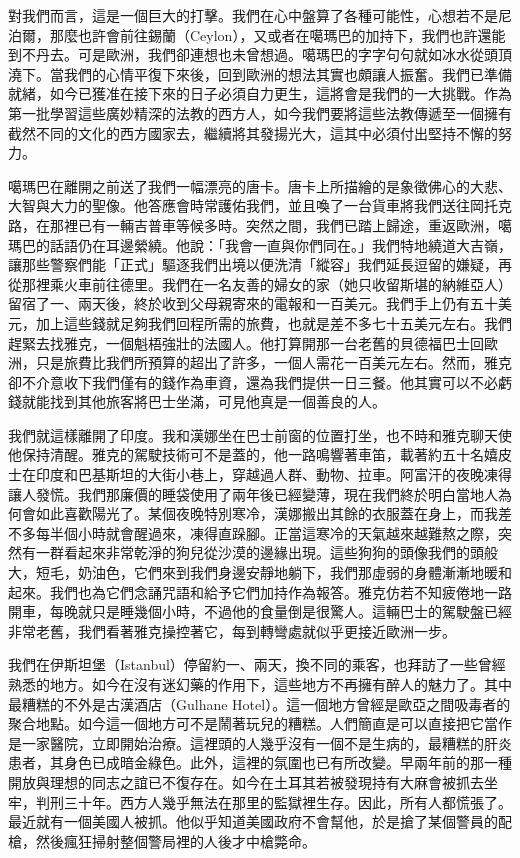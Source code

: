 對我們而言，這是一個巨大的打擊。我們在心中盤算了各種可能性，心想若不是尼泊爾，那麼也許會前往錫蘭（Ceylon），又或者在噶瑪巴的加持下，我們也許還能到不丹去。可是歐洲，我們卻連想也未曾想過。噶瑪巴的字字句句就如冰水從頭頂澆下。當我們的心情平復下來後，回到歐洲的想法其實也頗讓人振奮。我們已準備就緒，如今已獲准在接下來的日子必須自力更生，這將會是我們的一大挑戰。作為第一批學習這些廣妙精深的法教的西方人，如今我們要將這些法教傳遞至一個擁有截然不同的文化的西方國家去，繼續將其發揚光大，這其中必須付出堅持不懈的努力。

噶瑪巴在離開之前送了我們一幅漂亮的唐卡。唐卡上所描繪的是象徵佛心的大悲、大智與大力的聖像。他答應會時常護佑我們，並且喚了一台貨車將我們送往岡托克路，在那裡已有一輛吉普車等候多時。突然之間，我們已踏上歸途，重返歐洲，噶瑪巴的話語仍在耳邊縈繞。他說：「我會一直與你們同在。」我們特地繞道大吉嶺，讓那些警察們能「正式」驅逐我們出境以便洗清「縱容」我們延長逗留的嫌疑，再從那裡乘火車前往德里。我們在一名友善的婦女的家（她只收留斯堪的納維亞人）留宿了一、兩天後，終於收到父母親寄來的電報和一百美元。我們手上仍有五十美元，加上這些錢就足夠我們回程所需的旅費，也就是差不多七十五美元左右。我們趕緊去找雅克，一個魁梧強壯的法國人。他打算開那一台老舊的貝德福巴士回歐洲，只是旅費比我們所預算的超出了許多，一個人需花一百美元左右。然而，雅克卻不介意收下我們僅有的錢作為車資，還為我們提供一日三餐。他其實可以不必虧錢就能找到其他旅客將巴士坐滿，可見他真是一個善良的人。

我們就這樣離開了印度。我和漢娜坐在巴士前窗的位置打坐，也不時和雅克聊天使他保持清醒。雅克的駕駛技術可不是蓋的，他一路鳴響著車笛，載著約五十名嬉皮士在印度和巴基斯坦的大街小巷上，穿越過人群、動物、拉車。阿富汗的夜晚凍得讓人發慌。我們那廉價的睡袋使用了兩年後已經變薄，現在我們終於明白當地人為何會如此喜歡陽光了。某個夜晚特別寒冷，漢娜搬出其餘的衣服蓋在身上，而我差不多每半個小時就會醒過來，凍得直跺腳。正當這寒冷的天氣越來越難熬之際，突然有一群看起來非常乾淨的狗兒從沙漠的邊緣出現。這些狗狗的頭像我們的頭般大，短毛，奶油色，它們來到我們身邊安靜地躺下，我們那虛弱的身體漸漸地暖和起來。我們也為它們念誦咒語和給予它們加持作為報答。雅克仿若不知疲倦地一路開車，每晚就只是睡幾個小時，不過他的食量倒是很驚人。這輛巴士的駕駛盤已經非常老舊，我們看著雅克操控著它，每到轉彎處就似乎更接近歐洲一步。

我們在伊斯坦堡（Istanbul）停留約一、兩天，換不同的乘客，也拜訪了一些曾經熟悉的地方。如今在沒有迷幻藥的作用下，這些地方不再擁有醉人的魅力了。其中最糟糕的不外是古漢酒店（Gulhane
Hotel）。這一個地方曾經是歐亞之間吸毒者的聚合地點。如今這一個地方可不是鬧著玩兒的糟糕。人們簡直是可以直接把它當作是一家醫院，立即開始治療。這裡頭的人幾乎沒有一個不是生病的，最糟糕的肝炎患者，其身色已成暗金綠色。此外，這裡的氛圍也已有所改變。早兩年前的那一種開放與理想的同志之誼已不復存在。如今在土耳其若被發現持有大麻會被抓去坐牢，判刑三十年。西方人幾乎無法在那里的監獄裡生存。因此，所有人都慌張了。最近就有一個美國人被抓。他似乎知道美國政府不會幫他，於是搶了某個警員的配槍，然後瘋狂掃射整個警局裡的人後才中槍斃命。

